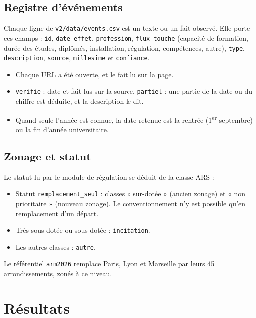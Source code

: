 \documentclass[11pt]{article}
\begin{document}
\subsection{Registre d'événements}
Chaque ligne de \texttt{v2/data/events.csv} est un texte ou un fait observé. Elle porte ces champs :
\texttt{id}, \texttt{date\_effet}, \texttt{profession}, \texttt{flux\_touche} (capacité de formation, durée des
études, diplômés, installation, régulation, compétences, autre), \texttt{type}, \texttt{description},
\texttt{source}, \texttt{millesime} et \texttt{confiance}.
\begin{itemize}
  \item Chaque URL a été ouverte, et le fait lu sur la page.
  \item \texttt{verifie} : date et fait lus sur la source. \texttt{partiel} : une partie de la date ou du chiffre
  est déduite, et la description le dit.
  \item Quand seule l'année est connue, la date retenue est la rentrée (1\textsuperscript{er} septembre) ou la fin
  d'année universitaire.
\end{itemize}

\subsection{Zonage et statut}
Le statut lu par le module de régulation se déduit de la classe ARS :
\begin{itemize}
  \item Statut \texttt{remplacement\_seul} : classes « sur-dotée » (ancien zonage) et « non prioritaire »
  (nouveau zonage). Le conventionnement n'y est possible qu'en remplacement d'un départ.
  \item Très sous-dotée ou sous-dotée : \texttt{incitation}.
  \item Les autres classes : \texttt{autre}.
\end{itemize}
Le référentiel \texttt{arm2026} remplace Paris, Lyon et Marseille par leurs 45 arrondissements, zonés à ce niveau.

\section{Résultats}
\end{document}
